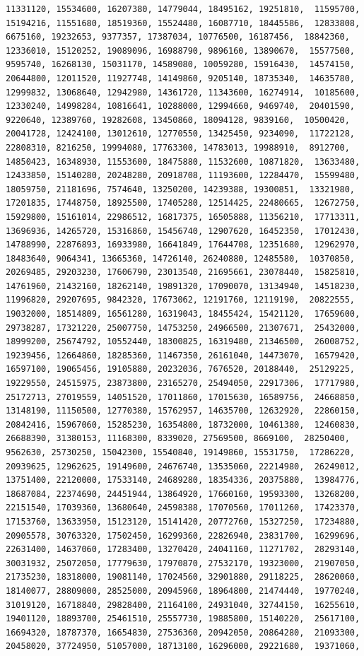 \documentclass[
]{article}
\begin{document}
\begin{verbatim}
11331120, 15534600, 16207380, 14779044, 18495162, 19251810,  11595700, 15194216, 11551680, 18519360, 15524480, 16087710, 18445586,  12833808, 6675160, 19232653, 9377357, 17387034, 10776500, 16187456,  18842360, 12336010, 15120252, 19089096, 16988790, 9896160, 13890670,  15577500, 9595740, 16268130, 15031170, 14589080, 10059280, 15916430,  14574150, 20644800, 12011520, 11927748, 14149860, 9205140, 18735340,  14635780, 12999832, 13068640, 12942980, 14361720, 11343600, 16274914,  10185600, 12330240, 14998284, 10816641, 10288000, 12994660, 9469740,  20401590, 9220640, 12389760, 19282608, 13450860, 18094128, 9839160,  10500420, 20041728, 12424100, 13012610, 12770550, 13425450, 9234090,  11722128, 22808310, 8216250, 19994080, 17763300, 14783013, 19988910,  8912700, 14850423, 16348930, 11553600, 18475880, 11532600, 10871820,  13633480, 12433850, 15140280, 20248280, 20918708, 11193600, 12284470,  15599480, 18059750, 21181696, 7574640, 13250200, 14239388, 19300851,  13321980, 17201835, 17448750, 18925500, 17405280, 12514425, 22480665,  12672750, 15929800, 15161014, 22986512, 16817375, 16505888, 11356210,  17713311, 13696936, 14265720, 15316860, 15456740, 12907620, 16452350,  17012430, 14788990, 22876893, 16933980, 16641849, 17644708, 12351680,  12962970, 18483640, 9064341, 13665360, 14726140, 26240880, 12485580,  10370850, 20269485, 29203230, 17606790, 23013540, 21695661, 23078440,  15825810, 14761960, 21432160, 18262140, 19891320, 17090070, 13134940,  14518230, 11996820, 29207695, 9842320, 17673062, 12191760, 12119190,  20822555, 19032000, 18514809, 16561280, 16319043, 18455424, 15421120,  17659600, 29738287, 17321220, 25007750, 14753250, 24966500, 21307671,  25432000, 18999200, 25674792, 10552440, 18300825, 16319480, 21346500,  26008752, 19239456, 12664860, 18285360, 11467350, 26161040, 14473070,  16579420, 16597100, 19065456, 19105880, 20232036, 7676520, 20188440,  25129225, 19229550, 24515975, 23873800, 23165270, 25494050, 22917306,  17717980, 25172713, 27019559, 14051520, 17011860, 17015630, 16589756,  24668850, 13148190, 11150500, 12770380, 15762957, 14635700, 12632920,  22860150, 20842416, 15967060, 15285230, 16354800, 18732000, 10461380,  12460830, 26688390, 31380153, 11168300, 8339020, 27569500, 8669100,  28250400, 9562630, 25730250, 15042300, 15540840, 19149860, 15531750,  17286220, 20939625, 12962625, 19149600, 24676740, 13535060, 22214980,  26249012, 13751400, 22120000, 17533140, 24689280, 18354336, 20375880,  13984776, 18687084, 22374690, 24451944, 13864920, 17660160, 19593300,  13268200, 22151540, 17039360, 13680640, 24598388, 17070560, 17011260,  17423370, 17153760, 13633950, 15123120, 15141420, 20772760, 15327250,  17234880, 20905578, 30763320, 17502450, 16299360, 22826940, 23831700,  16299696, 22631400, 14637060, 17283400, 13270420, 24041160, 11271702,  28293140, 30031932, 25072050, 17779630, 17970870, 27532170, 19323000,  21907050, 21735230, 18318000, 19081140, 17024560, 32901880, 29118225,  28620060, 18140077, 28809000, 28525000, 20945960, 18964800, 21474440,  19770240, 31019120, 16718840, 29828400, 21164100, 24931040, 32744150,  16255610, 19401120, 18893700, 25461510, 25557730, 19885800, 15140220,  25617100, 16694320, 18787370, 16654830, 27536360, 20942050, 20864280,  21093300, 20458020, 37724950, 51057000, 18713100, 16296000, 29221680,  19371060, 
\end{verbatim}
\end{document}
